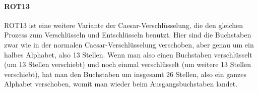 \paragraph{ROT13}
\label{sec:c-rot13}
ROT13 ist eine weitere Variante der Caesar-Verschlüsselung, die den gleichen Prozess zum Verschlüsseln und Entschlüsseln benutzt. Hier sind die Buchstaben zwar wie in der normalen Caesar-Verschlüsselung verschoben, aber genau um ein halbes Alphabet, also 13 Stellen. Wenn man also einen Buchstaben verschlüsselt (um 13 Stellen verschiebt) und noch einmal verschlüsselt (um weitere 13 Stellen verschiebt), hat man den Buchstaben um insgesamt 26 Stellen, also ein ganzes Alphabet verschoben, womit man wieder beim Ausgangsbuchstaben landet.

\begin{table}[]
\centering
\caption{Tabula Recta der ROT13-Verschlüsselung}
\label{tab:tabula-recta-rot13}
\end{table}


